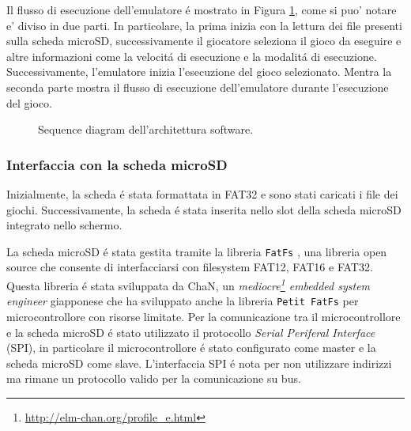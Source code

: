 \documentclass[a4paper]{article}
\begin{document}
Il flusso di esecuzione dell'emulatore é mostrato in Figura \ref{fig:sequence_diagram}, come si puo' notare e' diviso in due parti. In particolare, la prima inizia con la lettura dei file presenti sulla scheda microSD, successivamente il giocatore seleziona il gioco da eseguire e altre informazioni come la velocitá di esecuzione e la modalitá di esecuzione. Successivamente, l'emulatore inizia l'esecuzione del gioco selezionato. Mentra la seconda parte mostra il flusso di esecuzione dell'emulatore durante l'esecuzione del gioco.

\begin{figure}[h!t]
    \begin{center}
        
    \end{center}
    \caption{
        Sequence diagram dell'architettura software.
    }
    \label{fig:sequence_diagram}
\end{figure}

\subsubsection{Interfaccia con la scheda microSD}\label{subsubsec:sd}

Inizialmente, la scheda é stata formattata in FAT32 e sono stati caricati i file dei giochi. Successivamente, la scheda é stata inserita nello slot della scheda microSD integrato nello schermo.

\begin{Listing}[h!t] %
    \centering
    \caption{Caricamento di un gioco dalla scheda microSD.}
    \label{load_game}
\end{Listing}

La scheda microSD é stata gestita tramite la libreria \texttt{FatFs} \cite{elm-chan:fatfs}, una libreria open source che consente di interfacciarsi con filesystem FAT12, FAT16 e FAT32. Questa libreria é stata sviluppata da ChaN, un \textit{mediocre\footnote{\url{http://elm-chan.org/profile_e.html}} embedded system engineer} giapponese che ha sviluppato anche la libreria \texttt{Petit FatFs} per microcontrollore con risorse limitate.
Per la comunicazione tra il microcontrollore e la scheda microSD é stato utilizzato il protocollo \textit{Serial Periferal Interface} (SPI), in particolare il microcontrollore é stato configurato come master e la scheda microSD come slave. L'interfaccia SPI é nota per non utilizzare indirizzi ma rimane un protocollo valido per la comunicazione su bus.
\end{document}
